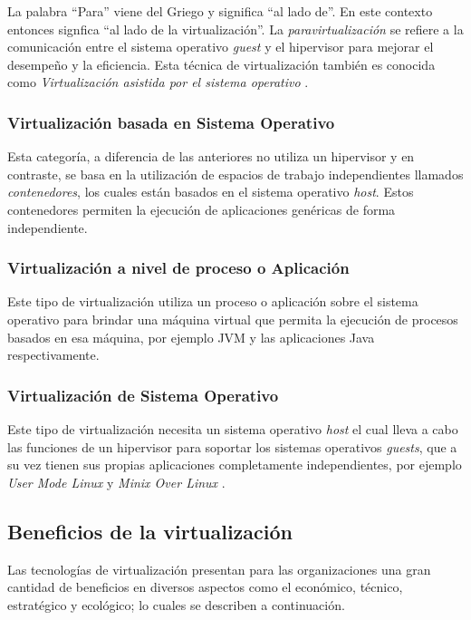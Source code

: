La palabra ``Para'' viene del Griego y significa ``al lado de''. En este contexto entonces signfica ``al lado de la virtualización''. La \textit{paravirtualización} se refiere a la comunicación entre el sistema operativo \textit{guest} y el hipervisor para mejorar el desempeño y la eficiencia. Esta técnica de virtualización también es conocida como \textit{Virtualización asistida por el sistema operativo} \parencite{VMware2008}.



\subsubsection{Virtualización basada en Sistema Operativo}
Esta categoría, a diferencia de las anteriores no utiliza un hipervisor y en contraste, se basa en la utilización de espacios de trabajo independientes llamados \textit{contenedores}, los cuales están basados en el sistema operativo \textit{host}. Estos contenedores permiten la ejecución de aplicaciones genéricas de forma independiente.\\

\subsubsection{Virtualización a nivel de proceso o Aplicación}
Este tipo de virtualización utiliza un proceso  o aplicación sobre el sistema operativo para brindar una máquina virtual que permita la ejecución de procesos basados en esa máquina, por ejemplo JVM y las aplicaciones Java respectivamente. \\ 

\subsubsection{Virtualización de Sistema Operativo}
Este tipo de virtualización necesita un sistema operativo \textit{host} el cual lleva a cabo las funciones de un hipervisor para soportar los sistemas operativos \textit{guests},  que a su vez tienen sus propias aplicaciones completamente independientes, por ejemplo \textit{User Mode Linux} \parencite{Dike2006}  y \textit{Minix Over Linux} \parencite{Pessolani2012}.


\subsection{Beneficios de la virtualización}

Las tecnologías de virtualización presentan para las organizaciones una gran cantidad de beneficios en diversos aspectos como el económico, técnico, estratégico y ecológico; lo cuales se describen a continuación.\\

